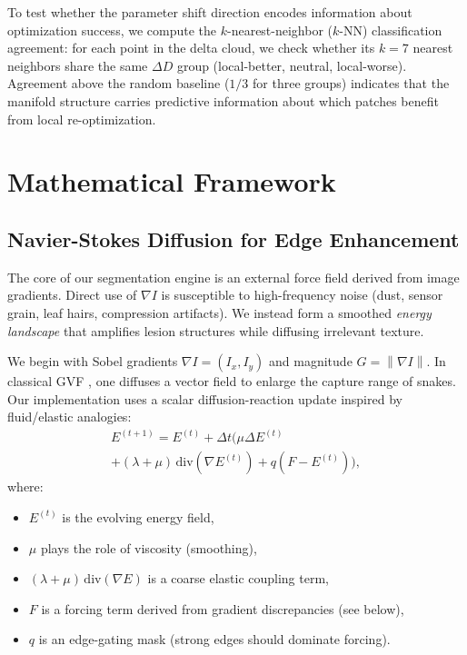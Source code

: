 \documentclass[11pt,a4paper]{article}
\newcommand{\grad}{\nabla}
\newcommand{\lap}{\Delta}
\newcommand{\norm}[1]{\left\lVert #1 \right\rVert}
\begin{document}
To test whether the parameter shift direction encodes information about optimization success, we compute the $k$-nearest-neighbor ($k$-NN) classification agreement: for each point in the delta cloud, we check whether its $k{=}7$ nearest neighbors share the same $\Delta D$ group (local-better, neutral, local-worse). Agreement above the random baseline ($1/3$ for three groups) indicates that the manifold structure carries predictive information about which patches benefit from local re-optimization.

\section{Mathematical Framework}

\subsection{Navier-Stokes Diffusion for Edge Enhancement}
The core of our segmentation engine is an external force field derived from image gradients. Direct use of $\grad I$ is susceptible to high-frequency noise (dust, sensor grain, leaf hairs, compression artifacts). We instead form a smoothed \emph{energy landscape} that amplifies lesion structures while diffusing irrelevant texture.

We begin with Sobel gradients $\grad I = (I_x, I_y)$ and magnitude $G = \norm{\grad I}$. In classical GVF \citep{xu1998gvf}, one diffuses a vector field to enlarge the capture range of snakes. Our implementation uses a scalar diffusion-reaction update inspired by fluid/elastic analogies:
\begin{multline}
E^{(t+1)} = E^{(t)} + \Delta t \Big( \mu \lap E^{(t)} \\
 + (\lambda{+}\mu)\,\mathrm{div}(\grad E^{(t)}) + q(F {-} E^{(t)}) \Big),
\label{eq:diffusion_update}
\end{multline}
where:
\begin{itemize}
    \item $E^{(t)}$ is the evolving energy field,
    \item $\mu$ plays the role of viscosity (smoothing),
    \item $(\lambda+\mu)\,\mathrm{div}(\grad E)$ is a coarse elastic coupling term,
    \item $F$ is a forcing term derived from gradient discrepancies (see below),
    \item $q$ is an edge-gating mask (strong edges should dominate forcing).
\end{itemize}
\end{document}
